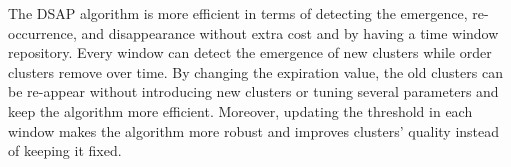 The DSAP algorithm is more efficient in terms of detecting the emergence, re-occurrence, and disappearance without extra cost and by having a time window repository. Every window can detect the emergence of new clusters while order clusters remove over time. By changing the expiration value, the old clusters can be re-appear without introducing new clusters or tuning several parameters and keep the algorithm more efficient. Moreover, updating the threshold in each window makes the algorithm more robust and improves clusters' quality instead of keeping it fixed. 


 











